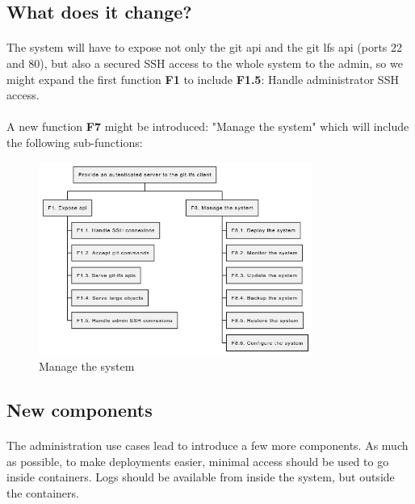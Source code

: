 \newpage
\subsection{What does it change?}

\paragraph{}
The system will have to expose not only the git api and the git lfs api (ports 22 and 80), but also a secured SSH access to the whole system to the admin, so we might expand the first function \textbf{F1} to include \textbf{F1.5}: Handle administrator SSH access. 

\paragraph{}
A new function \textbf{F7} might be introduced: "Manage the system" which will include the following sub-functions:

\begin{figure}[h]
    \centering
    \includegraphics[width=0.8\textwidth]{iteration_01/diagrams/functions_v2.png}
    \caption{Manage the system}
    \label{fig:functions_v2}
\end{figure}

\newpage
\subsection{New components}

\paragraph{}
The administration use cases lead to introduce a few more components. As much as possible, to make deployments easier, minimal access should be used to go inside containers. Logs should be available from inside the system, but outside the containers. 

